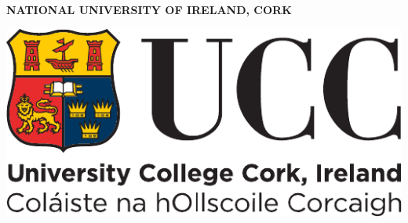 \thispagestyle{empty}


\begin{centering}

\large

\textbf{NATIONAL UNIVERSITY OF IRELAND, CORK}

\vspace{1cm}

\includegraphics[width=0.3\linewidth]{img/ucc_logo.pdf}

\end{centering}

\clearpage

\restoregeometry
